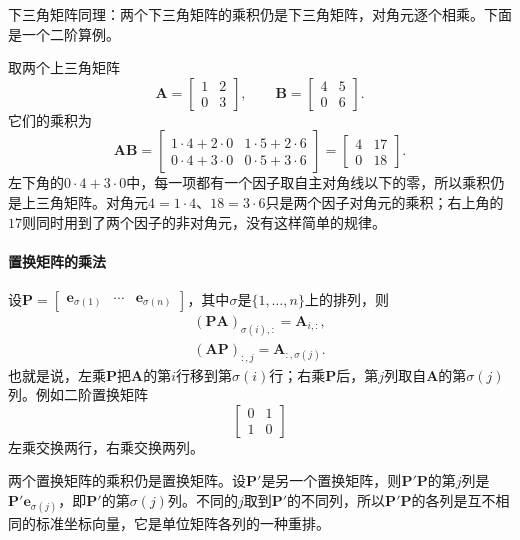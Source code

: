 下三角矩阵同理：两个下三角矩阵的乘积仍是下三角矩阵，对角元逐个相乘。下面是一个二阶算例。
\begin{example}[两个上三角矩阵的乘积]
\label{ex:ls-upper-triangular-product}
取两个上三角矩阵
\[
\bm A=\begin{bmatrix}1&2\\0&3\end{bmatrix},\qquad
\bm B=\begin{bmatrix}4&5\\0&6\end{bmatrix}.
\]
它们的乘积为
\[
 \bm A\bm B=\begin{bmatrix}1\cdot4+2\cdot0&1\cdot5+2\cdot6\\0\cdot4+3\cdot0&0\cdot5+3\cdot6\end{bmatrix}=\begin{bmatrix}4&17\\0&18\end{bmatrix}.
\]
左下角的$0\cdot4+3\cdot0$中，每一项都有一个因子取自主对角线以下的零，所以乘积仍是上三角矩阵。对角元$4=1\cdot4$、$18=3\cdot6$只是两个因子对角元的乘积；右上角的$17$则同时用到了两个因子的非对角元，没有这样简单的规律。
\end{example}

\paragraph{置换矩阵的乘法}
设$\bm P=\left[\begin{smallmatrix}\bm e_{\sigma(1)}&\cdots&\bm e_{\sigma(n)}\end{smallmatrix}\right]$，其中$\sigma$是$\{1,\ldots,n\}$上的排列，则
\[
 \begin{gathered}
(\bm P\bm A)_{\sigma(i),:}=\bm A_{i,:},\\
(\bm A\bm P)_{:,j}=\bm A_{:,\sigma(j)}.
 \end{gathered}
\]
也就是说，左乘$\bm P$把$\bm A$的第$i$行移到第$\sigma(i)$行；右乘$\bm P$后，第$j$列取自$\bm A$的第$\sigma(j)$列。例如二阶置换矩阵
\[
 \begin{bmatrix}0&1\\1&0\end{bmatrix}
\]
左乘交换两行，右乘交换两列。

两个置换矩阵的乘积仍是置换矩阵。设$\bm P'$是另一个置换矩阵，则$\bm P'\bm P$的第$j$列是$\bm P'\bm e_{\sigma(j)}$，即$\bm P'$的第$\sigma(j)$列。不同的$j$取到$\bm P'$的不同列，所以$\bm P'\bm P$的各列是互不相同的标准坐标向量，它是单位矩阵各列的一种重排。

